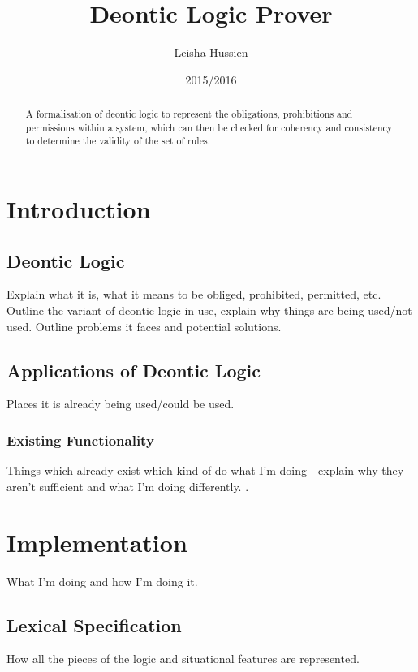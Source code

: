 \documentclass{l4proj}
\begin{document}
\title{Deontic Logic Prover}
\author{Leisha Hussien}
\date{2015/2016}
\maketitle

\begin{abstract}
A formalisation of deontic logic to represent the obligations, prohibitions and permissions within a system, which can then be checked for coherency and consistency to determine the validity of the set of rules.
\end{abstract}

\educationalconsent

\tableofcontents

\chapter{Introduction}

\section{Deontic Logic}
Explain what it is, what it means to be obliged, prohibited, permitted, etc. Outline the variant of deontic logic in use, explain why things are being used/not used. Outline problems it faces and potential solutions. 

\section{Applications of Deontic Logic}
Places it is already being used/could be used. 

\subsection{Existing Functionality}
Things which already exist which kind of do what I'm doing - explain why they aren't sufficient and what I'm doing differently. \cite{Powers}.

\chapter{Implementation}
What I'm doing and how I'm doing it. 

\section{Lexical Specification}
How all the pieces of the logic and situational features are represented. 
\end{document}
